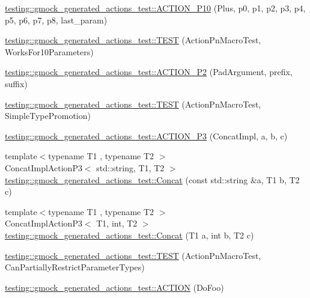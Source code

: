 \begin{DoxyCompactItemize}
\item 
\mbox{\hyperlink{namespacetesting_1_1gmock__generated__actions__test_a3c6e7ef6aefc94efc9e815e92f0b3e47}{testing\+::gmock\+\_\+generated\+\_\+actions\+\_\+test\+::\+A\+C\+T\+I\+O\+N\+\_\+\+P10}} (Plus, p0, p1, p2, p3, p4, p5, p6, p7, p8, last\+\_\+param)
\item 
\mbox{\hyperlink{namespacetesting_1_1gmock__generated__actions__test_a564fd77344f58b26577452a380c93935}{testing\+::gmock\+\_\+generated\+\_\+actions\+\_\+test\+::\+T\+E\+ST}} (Action\+Pn\+Macro\+Test, Works\+For10\+Parameters)
\item 
\mbox{\hyperlink{namespacetesting_1_1gmock__generated__actions__test_ad58030fe83ad47cdb4ff027f8399adb4}{testing\+::gmock\+\_\+generated\+\_\+actions\+\_\+test\+::\+A\+C\+T\+I\+O\+N\+\_\+\+P2}} (Pad\+Argument, prefix, suffix)
\item 
\mbox{\hyperlink{namespacetesting_1_1gmock__generated__actions__test_ad42236ad6c6d01fad6dd947ca6163d59}{testing\+::gmock\+\_\+generated\+\_\+actions\+\_\+test\+::\+T\+E\+ST}} (Action\+Pn\+Macro\+Test, Simple\+Type\+Promotion)
\item 
\mbox{\hyperlink{namespacetesting_1_1gmock__generated__actions__test_ae46434959151b83249e52d4869e28cf0}{testing\+::gmock\+\_\+generated\+\_\+actions\+\_\+test\+::\+A\+C\+T\+I\+O\+N\+\_\+\+P3}} (Concat\+Impl, a, b, c)
\item 
{\footnotesize template$<$typename T1 , typename T2 $>$ }\\Concat\+Impl\+Action\+P3$<$ std\+::string, T1, T2 $>$ \mbox{\hyperlink{namespacetesting_1_1gmock__generated__actions__test_aad9da9ba94e4ba373284d13305eda7e5}{testing\+::gmock\+\_\+generated\+\_\+actions\+\_\+test\+::\+Concat}} (const std\+::string \&a, T1 b, T2 c)
\item 
{\footnotesize template$<$typename T1 , typename T2 $>$ }\\Concat\+Impl\+Action\+P3$<$ T1, int, T2 $>$ \mbox{\hyperlink{namespacetesting_1_1gmock__generated__actions__test_ab7e41148b644bc80a67a90d584691978}{testing\+::gmock\+\_\+generated\+\_\+actions\+\_\+test\+::\+Concat}} (T1 a, int b, T2 c)
\item 
\mbox{\hyperlink{namespacetesting_1_1gmock__generated__actions__test_a7222610b197216e7976b3fa751f97daf}{testing\+::gmock\+\_\+generated\+\_\+actions\+\_\+test\+::\+T\+E\+ST}} (Action\+Pn\+Macro\+Test, Can\+Partially\+Restrict\+Parameter\+Types)
\item 
\mbox{\hyperlink{namespacetesting_1_1gmock__generated__actions__test_a183b3863b3c2319ac414fe694455f58c}{testing\+::gmock\+\_\+generated\+\_\+actions\+\_\+test\+::\+A\+C\+T\+I\+ON}} (Do\+Foo)

\end{DoxyCompactItemize}
